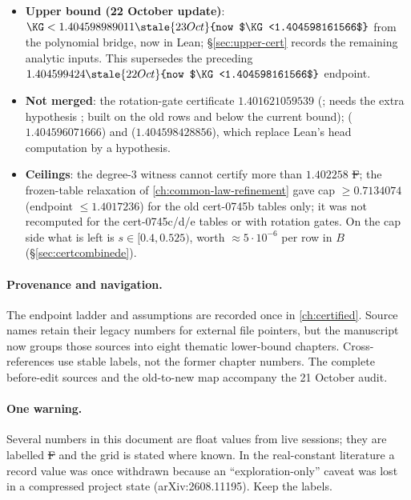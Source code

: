\begin{itemize}
\item \textbf{Upper bound (22 October update)}: $\KG<1.404598989011\stale{23 Oct}{now $\KG<1.404598161566$}$ from the polynomial bridge, now in Lean; \S\ref{sec:upper-cert} records the remaining analytic inputs. This supersedes the preceding $1.404599424\stale{22 Oct}{now $\KG<1.404598161566$}$ endpoint.
\item \textbf{Not merged}: the rotation-gate certificate $1.401621059539$ (; needs the extra hypothesis
; built on the old rows and below the current bound);  ($1.404596071666$) and 
($1.404598428856$), which replace Lean's head computation by a  hypothesis.
\item \textbf{Ceilings}: the degree-3 witness cannot certify more than $1.402258$ \st{F}; the frozen-table relaxation of \autoref{ch:common-law-refinement}
gave cap $\ge0.7134074$ (endpoint $\le1.4017236$) for the old cert-0745b tables only; it was not recomputed for the cert-0745c/d/e tables
or with rotation gates. On the cap side what is left is $s\in[0.4,0.525)$, worth $\approx5\cdot10^{-6}$ per row in $B$ (\S\ref{sec:certcombinede}).
\end{itemize}

\paragraph{Provenance and navigation.}
The endpoint ladder and assumptions are recorded once in
\autoref{ch:certified}. Source names retain their legacy numbers for
external file pointers, but the manuscript now groups those sources into
eight thematic lower-bound chapters. Cross-references use stable labels,
not the former chapter numbers. The complete before-edit sources and
the old-to-new map accompany the 21 October audit.

\paragraph{One warning.} Several numbers in this document are float values from live sessions; they are labelled \st{F}
and the grid is stated where known. In the real-constant literature a record value was once withdrawn because an
``exploration-only'' caveat was lost in a compressed project state (arXiv:2608.11195). Keep the labels.

